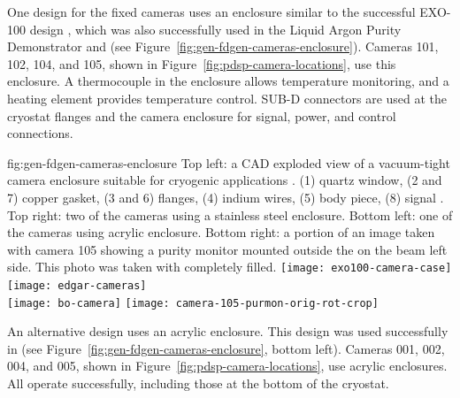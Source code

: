 One design for the  fixed cameras uses an enclosure similar to
the successful EXO-100 design \cite{Delaquis:2013hva}, which was also
successfully used in the Liquid Argon Purity Demonstrator
and  (see Figure~\ref{fig:gen-fdgen-cameras-enclosure}). Cameras 101, 102, 104, and 105, shown in Figure~\ref{fig:pdsp-camera-locations}, use this enclosure.
A thermocouple in the enclosure allows temperature monitoring, and a heating element provides temperature control.  
SUB-D connectors are used at the cryostat flanges and the camera enclosure for signal, power, and control connections.

\begin{dunefigure}{fig:gen-fdgen-cameras-enclosure}
  {Top left: a CAD exploded view of a vacuum-tight camera enclosure suitable for cryogenic applications \cite{Delaquis:2013hva}.
    (1) quartz window, (2 and 7) copper gasket, (3 and 6) flanges, (4) indium wires, (5) body piece, (8) signal \fdth.
    Top right: two of the  cameras using a stainless steel enclosure. 
    Bottom left: one of the  cameras using acrylic enclosure.
    Bottom right: a portion of an image taken with  camera 105 showing a purity monitor mounted outside the  on the beam left side. This photo was taken with  completely filled.
  }
  \texttt{[image: exo100-camera-case]}%
  \texttt{[image: edgar-cameras]}\\
  \hfill \texttt{[image: bo-camera]}%
  \hfill \texttt{[image: camera-105-purmon-orig-rot-crop]}%
  \hfill
\end{dunefigure}

An alternative design uses an acrylic enclosure.
This design was used successfully in  (see Figure~\ref{fig:gen-fdgen-cameras-enclosure}, bottom left). Cameras 001, 002, 004, and 005, shown in Figure~\ref{fig:pdsp-camera-locations}, use acrylic enclosures. 
All operate successfully, including those at the bottom of the cryostat.


